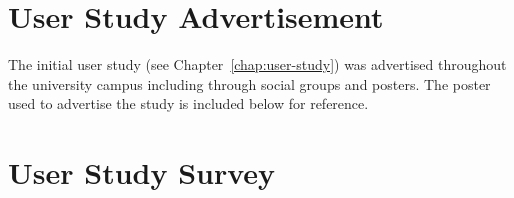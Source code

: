 \chapter{User Study Advertisement}
\label{appendix:user-study-advertisement}

The initial user study (see Chapter~\ref{chap:user-study}) was advertised throughout the university campus including through social groups and posters. The poster used to advertise the study is included below for reference.

\clearpage

\begin{center}
\end{center}

\chapter{User Study Survey}
\label{appendix:user-study-survey}

